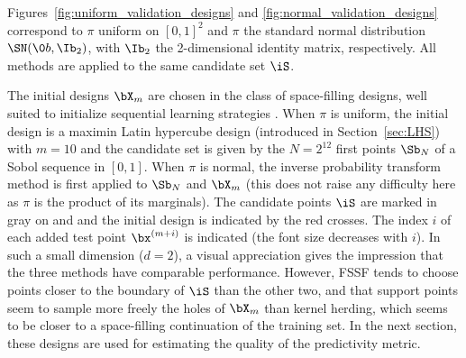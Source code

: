 Figures~\ref{fig:uniform_validation_designs} and \ref{fig:normal_validation_designs} correspond to $\pi$ uniform on $[0,1]^2$ and $\pi$ the standard normal distribution $\SN(\0b,\Ib_2)$, with $\Ib_2$ the 2-dimensional identity matrix, respectively. 
All methods are applied to the same candidate set $\iS$. 

The initial designs $\bX_m$ are chosen in the class of space-filling designs, well suited to initialize sequential learning strategies \citep{sanwil03}. 
When $\pi$ is uniform, the initial design is a maximin Latin hypercube design (introduced in Section~\ref{sec:LHS}) with $m=10$ and the candidate set is given by the $N=2^{12}$ first points $\Sb_N$ of a Sobol sequence in $[0,1]$. 
When $\pi$ is normal, the inverse probability transform method is first applied to $\Sb_N$ and $\bX_m$ (this does not raise any difficulty here as $\pi$ is the product of its marginals). 
The candidate points $\iS$ are marked in gray on  and  and the initial design is indicated by the red crosses. 
The index $i$ of each added test point $\bx^{(m+i)}$ is indicated (the font size decreases with $i$). 
In such a small dimension ($d=2$), a visual appreciation gives the impression that the three methods have comparable performance. 
However, FSSF tends to choose points closer to the boundary of $\iS$ than the other two, and that support points seem to sample more freely the holes of $\bX_m$ than kernel herding, which seems to be closer to a space-filling continuation of the training set. 
In the next section, these designs are used for estimating the quality of the predictivity metric.


